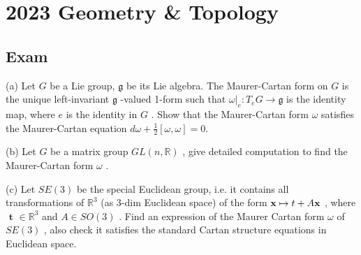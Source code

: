 \section{2023 Geometry \& Topology}

\subsection{Exam}

\begin{exercise}
\label{geometry:2023:1}
(a) Let $G$ be a Lie group, $\mathfrak { g }$ be its Lie algebra. The Maurer-Cartan form on $G$ is the unique left-invariant $\mathfrak { g }$ -valued 1-form such that $\omega | _ { e } : T _ { e } G \to \mathfrak { g }$ is the identity map, where $e$ is the identity in $G$ . Show that the Maurer-Cartan form $\omega$ satisfies the Maurer-Cartan equation $d \omega + \frac { 1 } { 2 } [ \omega , \omega ] = 0$.

(b) Let $G$ be a matrix group $G L ( n , \mathbb { R } )$ , give detailed computation to find the Maurer-Cartan form $\omega$ .

(c) Let $S E ( 3 )$ be the special Euclidean group, i.e. it contains all transformations of $\mathbb { R } ^ { 3 }$ (as 3-dim Euclidean space) of the form ${ \bf x } \mapsto t + A { \bf x }$ , where $\textbf { t } \in \mathbb { R } ^ { 3 }$ and $A \in S O ( 3 )$ . Find an expression of the Maurer Cartan form $\omega$ of $S E ( 3 )$ , also check it satisfies the standard Cartan structure equations in Euclidean space.
\end{exercise}

